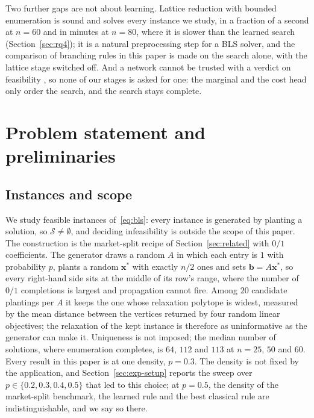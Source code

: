 \documentclass[final,5p,times,twocolumn,authoryear]{elsarticle}
\newcommand{\SOL}{\mathcal{S}}
\begin{document}
Two further gaps are not about learning. Lattice reduction with bounded enumeration \citep{aardal2000market,wassermann2025solving} is sound and solves every instance we study, in a fraction of a second at $n=60$ and in minutes at $n=80$, where it is slower than the learned search (Section~\ref{sec:rq4}); it is a natural preprocessing step for a BLS solver, and the comparison of branching rules in this paper is made on the search alone, with the lattice stage switched off. And a network cannot be trusted with a verdict on feasibility \citep{selsam2019neurosat,chen2023representing}, so none of our stages is asked for one: the marginal and the cost head only order the search, and the search stays complete.

\section{Problem statement and preliminaries}
\label{sec:problem}

\subsection{Instances and scope}
\label{sec:problem-instances}

We study feasible instances of~\eqref{eq:bls}: every instance is generated by planting a solution, so $\SOL\neq\emptyset$, and deciding infeasibility is outside the scope of this paper. The construction is the market-split recipe of Section~\ref{sec:related} with $0/1$ coefficients. The generator draws a random $A$ in which each entry is $1$ with probability $p$, plants a random $\mathbf{x}^\ast$ with exactly $n/2$ ones and sets $\mathbf{b}=A\mathbf{x}^\ast$, so every right-hand side sits at the middle of its row's range, where the number of $0/1$ completions is largest and propagation cannot fire. Among $20$ candidate plantings per $A$ it keeps the one whose relaxation polytope is widest, measured by the mean distance between the vertices returned by four random linear objectives; the relaxation of the kept instance is therefore as uninformative as the generator can make it. Uniqueness is not imposed; the median number of solutions, where enumeration completes, is $64$, $112$ and $113$ at $n=25$, $50$ and $60$. Every result in this paper is at one density, $p=0.3$. The density is not fixed by the application, and Section~\ref{sec:exp-setup} reports the sweep over $p\in\{0.2,0.3,0.4,0.5\}$ that led to this choice; at $p=0.5$, the density of the market-split benchmark, the learned rule and the best classical rule are indistinguishable, and we say so there.
\end{document}
